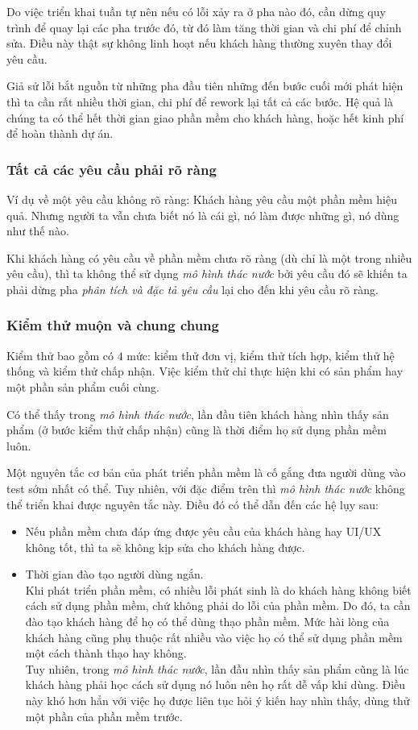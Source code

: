 \documentclass[14pt]{extarticle}
\begin{document}
Do việc triển khai tuần tự nên nếu có lỗi xảy ra ở pha nào đó, cần
dừng quy trình để quay lại các pha trước đó, từ đó làm tăng thời gian và chi phí
để chỉnh sửa. Điều này thật sự không linh hoạt nếu khách hàng thường xuyên
thay đổi yêu cầu.

Giả sử lỗi bắt nguồn từ những pha đầu tiên những đến bước cuối mới phát hiện
thì ta cần rất nhiều thời gian, chi phí để rework lại tất cả các bước.
Hệ quả là chúng ta có thể hết thời gian giao phần mềm cho khách hàng, hoặc
hết kinh phí để hoàn thành dự án.

\subsubsection*{Tất cả các yêu cầu phải rõ ràng} \label{sec:clear-req}

Ví dụ về một yêu cầu không rõ ràng: Khách hàng yêu cầu một phần mềm hiệu quả.
Nhưng người ta vẫn chưa biết nó là cái gì, nó làm được những gì, nó dùng
như thế nào.

Khi khách hàng có yêu cầu về phần mềm chưa rõ ràng (dù chỉ là một trong
nhiều yêu cầu), thì ta không thể sử dụng \textit{mô hình thác nước} bởi yêu cầu đó
sẽ khiến ta phải dừng pha \textit{phân tích và đặc tả yêu cầu} lại cho đến
khi yêu cầu rõ ràng.


\subsubsection*{Kiểm thử muộn và chung chung}
Kiểm thử bao gồm có $4$ mức: kiểm thử đơn vị, kiểm thử tích hợp, kiểm thử
hệ thống và kiểm thử chấp nhận. Việc kiểm thử chỉ thực hiện khi có sản phẩm
hay một phần sản phẩm cuối cùng.

Có thể thấy trong \textit{mô hình thác nước}, lần đầu tiên khách hàng nhìn thấy sản phẩm
(ở bước kiểm thử chấp nhận) cũng là thời điểm họ sử dụng phần mềm luôn.

Một nguyên tắc cơ bản của phát triển phần mềm là cố gắng đưa người dùng vào
test sớm nhất có thể. Tuy nhiên, với đặc điểm trên thì \textit{mô hình thác nước}
không thể triển khai được nguyên tắc này. Điều đó có thể dẫn đến các
hệ lụy sau:
\begin{itemize}
  \item Nếu phần mềm chưa đáp ứng được yêu cầu của khách hàng hay
        UI/UX không tốt, thì ta sẽ không kịp sửa cho khách hàng được.
  \item Thời gian đào tạo người dùng ngắn.\\
        Khi phát triển phần mềm, có nhiều lỗi phát sinh là do khách hàng
        không biết cách sử dụng phần mềm, chứ không phải do lỗi của phần mềm.
        Do đó, ta cần đào tạo khách hàng để họ có thể dùng thạo phần mềm.
        Mức hài lòng của khách hàng cũng phụ thuộc rất nhiều vào việc họ
        có thể sử dụng phần mềm một cách thành thạo hay không.\\
        Tuy nhiên, trong \textit{mô hình thác nước}, lần đầu nhìn thấy sản phẩm cũng
        là lúc khách hàng phải học cách sử dụng nó luôn nên họ rất dễ vấp
        khi dùng. Điều này khó hơn hẳn với việc họ được liên tục hỏi ý kiến
        hay nhìn thấy, dùng thử một phần của phần mềm trước.
\end{itemize}
\end{document}
